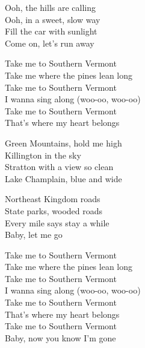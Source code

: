 \begin{lyrics}
Ooh, the hills are calling\\
Ooh, in a sweet, slow way\\
Fill the car with sunlight\\
Come on, let’s run away

Take me to Southern Vermont\\
Take me where the pines lean long\\
Take me to Southern Vermont\\
I wanna sing along
(woo-oo, woo-oo)\\
Take me to Southern Vermont\\
That’s where my heart belongs

Green Mountains, hold me high\\
Killington in the sky\\
Stratton with a view so clean\\
Lake Champlain, blue and wide

Northeast Kingdom roads\\
State parks, wooded roads\\
Every mile says stay a while\\
Baby, let me go

Take me to Southern Vermont\\
Take me where the pines lean long\\
Take me to Southern Vermont\\
I wanna sing along
(woo-oo, woo-oo)\\
Take me to Southern Vermont\\
That’s where my heart belongs\\
Take me to Southern Vermont\\
Baby, now you know I’m gone
\end{lyrics}

